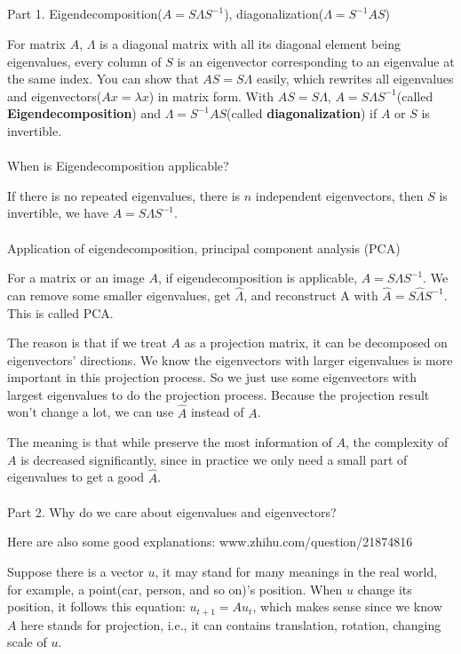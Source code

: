 \documentclass{article}
\begin{document}
\begin{spacing}{1.5}
\section{}
Part 1. Eigendecomposition($A=S\Lambda S^{-1}$), diagonalization($\Lambda = S^{-1}AS$)

For matrix $A$, $\Lambda$ is a diagonal matrix with all its diagonal element being eigenvalues, every column of $S$ is an eigenvector corresponding to an eigenvalue at the same index. You can show that $AS=S\Lambda$ easily, which rewrites all eigenvalues and eigenvectors($Ax=\lambda x$) in matrix form. With $AS=S\Lambda$, $A=S\Lambda S^{-1}$(called {\bfseries Eigendecomposition}) and $\Lambda = S^{-1}AS$(called {\bfseries diagonalization}) if $A$ or $S$ is invertible. 
\\\\When is Eigendecomposition applicable?

If there is no repeated eigenvalues, there is $n$ independent eigenvectors, then $S$ is invertible, we have $A=S\Lambda S^{-1}$. 
\\\\ Application of eigendecomposition, principal component analysis (PCA)

For a matrix or an image $A$, if eigendecomposition is applicable, $A=S\Lambda S^{-1}$. We can remove some smaller eigenvalues, get $\hat \Lambda$, and reconstruct A with $\hat A=S\hat \Lambda S^{-1}$. This is called PCA. 

The reason is that if we treat $A$ as a projection matrix, it can be decomposed on eigenvectors' directions. We know the eigenvectors with larger eigenvalues is more important in this projection process. So we just use some eigenvectors with largest eigenvalues to do the projection process. Because the projection result won't change a lot, we can use $\hat A$ instead of $A$.

The meaning is that while preserve the most information of $A$, the complexity of $A$ is decreased significantly, since in practice we only need a small part of eigenvalues to get a good $\hat A$.
\\\\ Part 2.  Why do we care about eigenvalues and eigenvectors?

Here are also some good explanations: www.zhihu.com/question/21874816

Suppose there is a vector $u$, it may stand for many meanings  in the real world, for example, a point(car, person, and so on)'s position. When $u$ change its position, it follows this equation: $u_{t+1}=Au_t$, which makes sense since we know $A$ here stands for projection, i.e., it can contains translation, rotation, changing scale of $u$.


\end{spacing}
\end{document}

